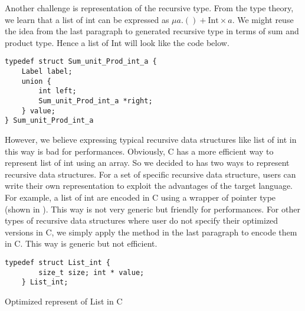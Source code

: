 Another challenge is representation of the recursive type. From the type theory, we learn that a list of int can be expressed as $\mu a. () + \text{Int} \times a$. We might reuse the idea from the last paragraph to generated recursive type in terms of sum and product type. Hence a list of Int will look like the code below.
\begin{verbatim}
typedef struct Sum_unit_Prod_int_a {
    Label label;
    union {
        int left;
        Sum_unit_Prod_int_a *right;
    } value;
} Sum_unit_Prod_int_a
\end{verbatim}
However, we believe expressing typical recursive data structures like list of int in this way is bad for performances. Obviously, C has a more efficient way to represent list of int using an array. So we decided to has two ways to represent recursive data structures. For a set of specific recursive data structure, users can write their own representation to exploit the advantages of the target language. For example, a list of int are encoded in C using a wrapper of pointer type (shown in ). This way is not very generic but friendly for performances. For other types of recursive data structures where user do not specify their optimized versions in C, we simply apply the method in the last paragraph to encode them in C. This way is generic but not efficient.
\begin{code}
\begin{verbatim}
typedef struct List_int {
        size_t size; int * value;
    } List_int;
\end{verbatim}
\caption{Optimized represent of List in C}
\label{codegen:code:list}
\end{code}
